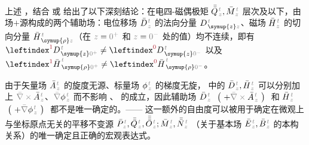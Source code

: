 上述 ，结合  或  给出了以下深刻结论：在电四-磁偶极矩 $\bar{\bar{Q}}^{\;\!\mathcolor{gray}{t}}_{\;\!\mathcolor{gray}{z}}, \bar{M}^{\;\!\mathcolor{gray}{t}}_{\;\!\mathcolor{gray}{z}}$ 层次及以下，由场$+$源构成的两个辅助场：电位移场 $\bar{D}^{\;\!\mathcolor{gray}{t}}_{\;\!\mathcolor{gray}{z}}$ 的法向分量 $D^{\;\!\mathcolor{gray}{t}}_{\;\! \symup{z} \mathcolor{gray}{z}}$、磁场 $\bar{H}^{\;\!\mathcolor{gray}{t}}_{\;\!\mathcolor{gray}{z}}$ 的切向分量 $\bar{H}^{\;\!\mathcolor{gray}{t}}_{\;\! \symup{\rho} \mathcolor{gray}{z}}$（在 $\mathcolor{gray}{z \mathcolor{black}{=} 0^+}$ 和 $\mathcolor{gray}{z \mathcolor{black}{=} 0^-}$ 处的值）均不连续，即有 $\leftindex^{\textcolor{Maroon}{1}} D^{\;\!\mathcolor{gray}{t}}_{\;\! \symup{z} \mathcolor{gray}{0^+}} \neq \leftindex^{\textcolor{Maroon}{0}} D^{\;\!\mathcolor{gray}{t}}_{\;\! \symup{z} \mathcolor{gray}{0^-}}$ 以及 $\leftindex^{\textcolor{Maroon}{1}} {\bar{H}}^{\;\!\mathcolor{gray}{t}}_{\;\! \symup{\rho} \mathcolor{gray}{0^+}} \neq \leftindex^{\textcolor{Maroon}{0}} {\bar{H}}^{\;\!\mathcolor{gray}{t}}_{\;\! \symup{\rho} \mathcolor{gray}{0^-}}$。

由于矢量场 $\bar{A}^{\;\!\mathcolor{gray}{t}}_{\;\!\mathcolor{gray}{z}}$ 的旋度无源、标量场 $\phi^{\;\!\mathcolor{gray}{t}}_{\;\!\mathcolor{gray}{z}}$ 的梯度无旋， 中的 $\bar{D}^{\;\!\mathcolor{gray}{t}}_{\;\!\mathcolor{gray}{z}}, \bar{H}^{\;\!\mathcolor{gray}{t}}_{\;\!\mathcolor{gray}{z}}$ 可以分别加上 $\mathcolor{gray}{\bar{\nabla} \times} \bar{A}^{\;\!\mathcolor{gray}{t}}_{\;\!\mathcolor{gray}{z}}$、$\mathcolor{gray}{\bar{\nabla}} \phi^{\;\!\mathcolor{gray}{t}}_{\;\!\mathcolor{gray}{z}}$ 而不影响 、 的成立，因此辅助场 $\bar{D}^{\;\!\mathcolor{gray}{t}}_{\;\!\mathcolor{gray}{z}}$ $~\left(~ + \mathcolor{gray}{\bar{\nabla} \times} \bar{A}^{\;\!\mathcolor{gray}{t}}_{\;\!\mathcolor{gray}{z}} ~\right)~$ 和 $\bar{H}^{\;\!\mathcolor{gray}{t}}_{\;\!\mathcolor{gray}{z}}$ $~\left(~ + \mathcolor{gray}{\bar{\nabla}} \phi^{\;\!\mathcolor{gray}{t}}_{\;\!\mathcolor{gray}{z}} ~\right)~$ 都不是唯一确定的。—— 这一额外的自由度可以被用于确定在微观上与坐标原点无关的平移不变源 $\bar{P}^{\;\!\mathcolor{gray}{t}}_{\;\!\mathcolor{gray}{z}},\bar{\bar{Q}}^{\;\!\mathcolor{gray}{t}}_{\;\!\mathcolor{gray}{z}},\bar{\bar{\bar{O}}}^{\;\!\mathcolor{gray}{t}}_{\;\!\mathcolor{gray}{z}} ; \bar{M}^{\;\!\mathcolor{gray}{t}}_{\;\!\mathcolor{gray}{z}}, \bar{\bar{N}}^{\;\!\mathcolor{gray}{t}}_{\;\!\mathcolor{gray}{z}}$ （关于基本场 $\bar{E}^{\;\!\mathcolor{gray}{t}}_{\;\!\mathcolor{gray}{z}}, \bar{B}^{\;\!\mathcolor{gray}{t}}_{\;\!\mathcolor{gray}{z}}$ 的本构关系）的唯一确定且正确的宏观表达式\cite{welterTranslationallyInvariantSemiclassical2013,delangeTranslationalInvariancePost2012,langeTransitionMicroscopicMacroscopic2012,langeMultipoleTheoryHehl2015,raabCommentOriginDependence2010a,OriginindependentCalculationQuadrupole}。

